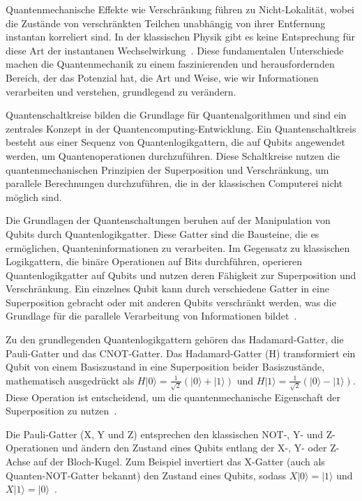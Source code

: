 Quantenmechanische Effekte wie Verschränkung führen zu Nicht-Lokalität, wobei die Zustände von verschränkten 
Teilchen unabhängig von ihrer Entfernung instantan korreliert sind. In der klassischen Physik gibt es keine 
Entsprechung für diese Art der instantanen Wechselwirkung~\cite{aspect1982experimental}. Diese fundamentalen Unterschiede 
machen die Quantenmechanik zu einem faszinierenden und herausfordernden Bereich, der das Potenzial hat, 
die Art und Weise, wie wir Informationen verarbeiten und verstehen, grundlegend zu verändern.






Quantenschaltkreise bilden die Grundlage für Quantenalgorithmen und sind ein zentrales Konzept in der 
Quantencomputing-Entwicklung. Ein Quantenschaltkreis besteht aus einer Sequenz von Quantenlogikgattern, 
die auf Qubits angewendet werden, um Quantenoperationen durchzuführen. Diese Schaltkreise nutzen die 
quantenmechanischen Prinzipien der Superposition und Verschränkung, um parallele Berechnungen durchzuführen, 
die in der klassischen Computerei nicht möglich sind.

Die Grundlagen der Quantenschaltungen beruhen auf der Manipulation von Qubits durch Quantenlogikgatter. 
Diese Gatter sind die Bausteine, die es ermöglichen, Quanteninformationen zu verarbeiten. Im Gegensatz 
zu klassischen Logikgattern, die binäre Operationen auf Bits durchführen, operieren Quantenlogikgatter 
auf Qubits und nutzen deren Fähigkeit zur Superposition und Verschränkung. Ein einzelnes Qubit kann durch 
verschiedene Gatter in eine Superposition gebracht oder mit anderen Qubits verschränkt werden, was die 
Grundlage für die parallele Verarbeitung von Informationen bildet~\cite{nielsen2010quantum}.

Zu den grundlegenden Quantenlogikgattern gehören das Hadamard-Gatter, die Pauli-Gatter und das CNOT-Gatter. 
Das Hadamard-Gatter (H) transformiert ein Qubit von einem Basiszustand in eine Superposition beider 
Basiszustände, mathematisch ausgedrückt als \( H|0\rangle = \frac{1}{\sqrt{2}}(|0\rangle + |1\rangle) \) 
und \( H|1\rangle = \frac{1}{\sqrt{2}}(|0\rangle - |1\rangle) \). Diese Operation ist entscheidend, um 
die quantenmechanische Eigenschaft der Superposition zu nutzen~\cite{griffiths2018introduction}.

Die Pauli-Gatter (X, Y und Z) entsprechen den klassischen NOT-, Y- und Z-Operationen und ändern den 
Zustand eines Qubits entlang der X-, Y- oder Z-Achse auf der Bloch-Kugel. Zum Beispiel invertiert 
das X-Gatter (auch als Quanten-NOT-Gatter bekannt) den Zustand eines Qubits, 
sodass \( X|0\rangle = |1\rangle \) und \( X|1\rangle = |0\rangle \)~\cite{nielsen2010quantum}.


